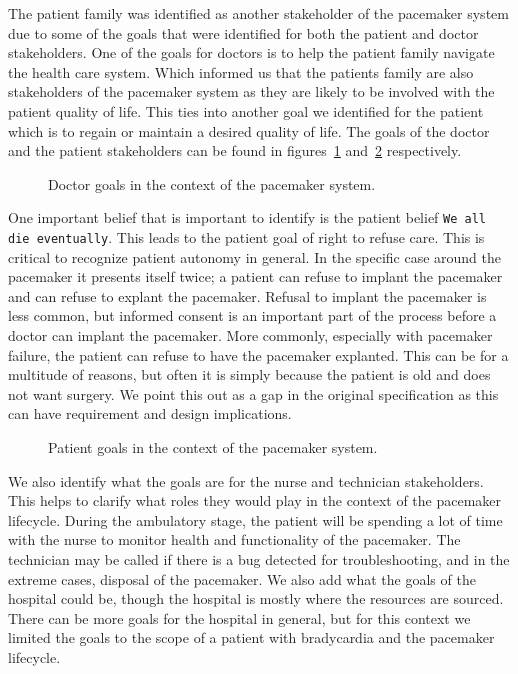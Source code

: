 The patient family was identified as another stakeholder of the pacemaker system due to some of the goals that were identified for both the patient and doctor stakeholders. One of the goals for doctors is to help the patient family navigate the health care system. Which informed us that the patients family are also stakeholders of the pacemaker system as they are likely to be involved with the patient quality of life. This ties into another goal we identified for the patient which is to regain or maintain a desired quality of life. The goals of the doctor and the patient stakeholders can be found in figures~\ref{fig:doctor_goals} and~\ref{fig:patient_goals} respectively.

\begin{figure}
	\centering
	
	\caption{Doctor goals in the context of the pacemaker system.}
	\label{fig:doctor_goals}
\end{figure}

One important belief that is important to identify is the patient belief \texttt{We all die eventually}. This leads to the patient goal of right to refuse care. This is critical to recognize patient autonomy in general. In the specific case around the pacemaker it presents itself twice; a patient can refuse to implant the pacemaker and can refuse to explant the pacemaker. Refusal to implant the pacemaker is less common, but informed consent is an important part of the process before a doctor can implant the pacemaker. More commonly, especially with pacemaker failure, the patient can refuse to have the pacemaker explanted. This can be for a multitude of reasons, but often it is simply because the patient is old and does not want surgery. We point this out as a gap in the original specification as this can have requirement and design implications.

\begin{figure}
	\centering
	
	\caption{Patient goals in the context of the pacemaker system.}
	\label{fig:patient_goals}
\end{figure}

We also identify what the goals are for the nurse and technician stakeholders. This helps to clarify what roles they would play in the context of the pacemaker lifecycle. During the ambulatory stage, the patient will be spending a lot of time with the nurse to monitor health and functionality of the pacemaker. The technician may be called if there is a bug detected for troubleshooting, and in the extreme cases, disposal of the pacemaker. We also add what the goals of the hospital could be, though the hospital is mostly where the resources are sourced. There can be more goals for the hospital in general, but for this context we limited the goals to the scope of a patient with bradycardia and the pacemaker lifecycle.

